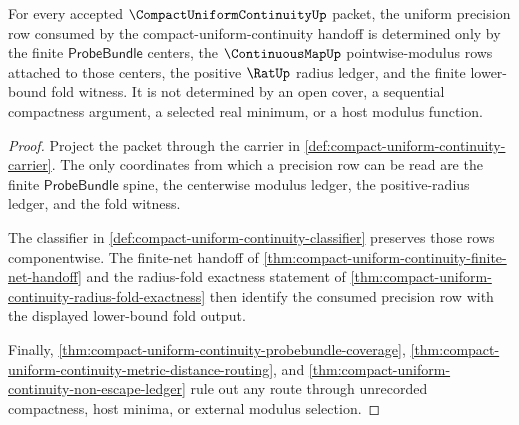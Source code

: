 \begin{theorem}
\label{thm:compact-uniform-continuity-modulus-choice-surface}
For every accepted $\CompactUniformContinuityUp$ packet, the uniform precision row consumed by the compact-uniform-continuity handoff is determined only by the finite $\mathsf{ProbeBundle}$ centers, the $\ContinuousMapUp$ pointwise-modulus rows attached to those centers, the positive $\RatUp$ radius ledger, and the finite lower-bound fold witness. It is not determined by an open cover, a sequential compactness argument, a selected real minimum, or a host modulus function.
\end{theorem}
\begin{proof}
Project the packet through the carrier in \autoref{def:compact-uniform-continuity-carrier}. The only coordinates from which a precision row can be read are the finite $\mathsf{ProbeBundle}$ spine, the centerwise modulus ledger, the positive-radius ledger, and the fold witness.

The classifier in \autoref{def:compact-uniform-continuity-classifier} preserves those rows componentwise. The finite-net handoff of \autoref{thm:compact-uniform-continuity-finite-net-handoff} and the radius-fold exactness statement of \autoref{thm:compact-uniform-continuity-radius-fold-exactness} then identify the consumed precision row with the displayed lower-bound fold output.

Finally, \autoref{thm:compact-uniform-continuity-probebundle-coverage}, \autoref{thm:compact-uniform-continuity-metric-distance-routing}, and \autoref{thm:compact-uniform-continuity-non-escape-ledger} rule out any route through unrecorded compactness, host minima, or external modulus selection.
\end{proof}

